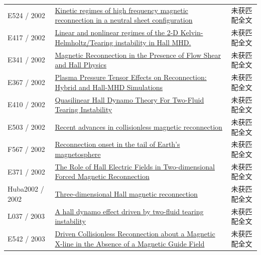 \begin{longtable}{P{24mm}P{97mm}P{27mm}}
E524 / 2002 & \href{https://doi.org/10.1063/1.1435002}{Kinetic regimes of high frequency magnetic reconnection in a neutral sheet configuration} & 未获匹配全文\\

E417 / 2002 & \href{http://ui.adsabs.harvard.edu/abs/2002APS..DPPCP1016C/abstract}{Linear and nonlinear regimes of the 2-D Kelvin-Helmholtz/Tearing instability in Hall MHD.} & 未获匹配全文\\

E341 / 2002 & \href{http://ui.adsabs.harvard.edu/abs/2002AGUFMSM61A0444O/abstract}{Magnetic Reconnection in the Presence of Flow Shear and Hall Physics} & 未获匹配全文\\

E367 / 2002 & \href{https://ui.adsabs.harvard.edu/abs/2002APS..DPPUI1005Y/abstract}{Plasma Pressure Tensor Effects on Reconnection: Hybrid and Hall-MHD Simulations} & 未获匹配全文\\

E410 / 2002 & \href{https://ui.adsabs.harvard.edu/abs/2002APS..DPPCP1015M/abstract}{Quasilinear Hall Dynamo Theory For Two-Fluid Tearing Instability} & 未获匹配全文\\

E503 / 2002 & \href{https://doi.org/10.1088/0741-3335/44/12b/327}{Recent advances in collisionless magnetic reconnection} & 未获匹配全文\\

F567 / 2002 & \href{https://doi.org/10.1029/2001ja009148}{Reconnection onset in the tail of Earth's magnetosphere} & 未获匹配全文\\

E371 / 2002 & \href{http://ui.adsabs.harvard.edu/abs/2002AGUFMSM61A0467D/abstract}{The Role of Hall Electric Fields in Two-dimensional Forced Magnetic Reconnection} & 未获匹配全文\\

Huba2002 / 2002 & \href{https://doi.org/10.1063/1.1514970}{Three-dimensional Hall magnetic reconnection} & 未获匹配全文\\

L037 / 2003 & \href{https://doi.org/10.1134/1.1592555}{A hall dynamo effect driven by two-fluid tearing instability} & 未获匹配全文\\

E542 / 2003 & \href{http://citeseerx.ist.psu.edu/viewdoc/summary?doi=10.1.1.959.2557}{Driven Collisionless Reconnection about a Magnetic X-line in the Absence of a Magnetic Guide Field} & 未获匹配全文\\


\end{longtable}
